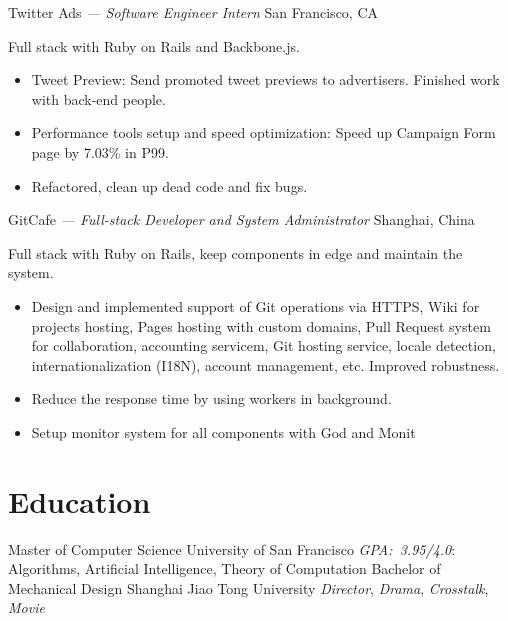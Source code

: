 \documentclass[]{friggeri-cv} %
\begin{document}
  \begin{entrylist}
  {Twitter Ads \emph{--- Software Engineer Intern}}
  {San Francisco, CA}
  {
    Full stack with Ruby on Rails and Backbone.js.\@
    \begin{itemize}
      \item Tweet Preview: Send promoted tweet previews to advertisers. Finished work with back-end people.
      \item Performance tools setup and speed optimization: Speed up Campaign Form page by 7.03\% in P99.
      \item Refactored, clean up dead code and fix bugs.
    \end{itemize}
  }
  {GitCafe \emph{--- Full-stack Developer and System Administrator}}
  {Shanghai, China}
  {
    Full stack with Ruby on Rails, keep components in edge and maintain the system.\@
    \begin{itemize}
    \item Design and implemented support of Git operations via HTTPS, Wiki for projects hosting,
    Pages hosting with custom domains, Pull Request system for collaboration,
    accounting servicem, Git hosting service,
    locale detection, internationalization (I18N), account management, etc.
    Improved robustness.
    \item Reduce the response time by using workers in background.
    \item Setup monitor system for all components with God and Monit
    \end{itemize}
  }
\end{entrylist}


\section{Education}

\begin{entrylist}
  {Master \textnormal{of Computer Science}}
  {University of San Francisco}
  {
    \emph{GPA:~3.95/4.0}: Algorithms, Artificial Intelligence, Theory of Computation
  }
  {Bachelor \textnormal{of Mechanical Design}}
  {Shanghai Jiao Tong University}
  {
    \emph{Director}, \emph{Drama}, \emph{Crosstalk}, \emph{Movie}
  }
\end{entrylist}
\end{document}
